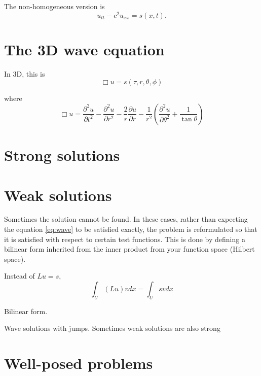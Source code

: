 The non-homogeneous version is
\begin{equation}
u_{tt}-c^2 u_{xx} = s(x,t).
\end{equation}


\section{The 3D wave equation}

In 3D, this is 
\begin{equation}
\Box u = s(\tau,r,\theta,\phi)
\end{equation}

where
\begin{equation}
\Box u= \frac{\partial^2 u}{\partial t^2} - \frac{\partial^2 u}{\partial r^2}- \frac{2}{r}\frac{\partial u}{\partial r} - \frac{1}{r^2}\left( \frac{\partial^2 u}{\partial \theta ^ 2}+\frac{1}{\tan \theta} \right)
\end{equation}

\section{Strong solutions}


\section{Weak solutions}\label{sec:WeakSolutions}
Sometimes the solution cannot be found. In these cases, rather than expecting the equation \ref{eq:wave} to be satisfied exactly, the problem is reformulated so that it is satisfied with respect to certain test functions. This is done by defining a bilinear form inherited from the inner product from your function space (Hilbert space). 

Instead of $Lu=s$, 
\begin{equation}
\int_{U} (Lu)v dx = \int_{U} sv dx
\end{equation}

Bilinear form. 

Wave solutions with jumps. Sometimes weak solutions are also strong 

\section{Well-posed problems}

